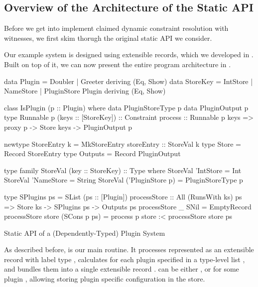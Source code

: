 \documentclass[demotion-paper.tex]{subfiles}
\begin{document}
\subsection{Overview of the Architecture of the Static API}\label{sec:static-api}
Before we get into implement claimed dynamic constraint resolution with witnesses, we first skim thorugh the original static API we consider.

Our example system is designed using extensible records, which we developed in .
Built on top of it, we can now present the entire program architecture in .
\begin{listing}[hptb]
\begin{code}
data Plugin = Doubler | Greeter deriving (Eq, Show)
data StoreKey = IntStore | NameStore | PluginStore Plugin deriving (Eq, Show)

class IsPlugin (p :: Plugin) where
  data PluginStoreType p
  data PluginOutput p
  type Runnable p (keys :: [StoreKey]) :: Constraint
  process :: Runnable p keys => proxy p -> Store keys -> PluginOutput p

newtype StoreEntry k = MkStoreEntry {storeEntry :: StoreVal k}
type Store = Record StoreEntry
type Outputs = Record PluginOutput

type family StoreVal (key :: StoreKey) :: Type where
  StoreVal 'IntStore = Int
  StoreVal 'NameStore = String
  StoreVal ('PluginStore p) = PluginStoreType p

type SPlugins ps = SList (ps :: [Plugin])
processStore :: All (RunsWith ks) ps => Store ks -> SPlugins ps -> Outputs ps
processStore _ SNil = EmptyRecord
processStore store (SCons p ps) = process p store :< processStore store ps
\end{code}
\caption{Static API of a (Dependently-Typed) Plugin System}
\label{lst:plugin-arch}
\end{listing}
As described before,  is our main routine.
It processes  represented as an extensible record with label type , calculates  for each plugin specified in a type-level list , and bundles them into a single extensible record .
 can be either ,  or  for some plugin , allowing storing plugin specific configuration in the store.
\end{document}
